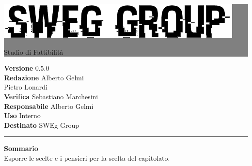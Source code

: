 \documentclass[12pt,a4paper,titlepage]{article}
\newcommand{\HRule}[1]{\hfill \rule{0.2\linewidth}{#1}} %
\begin{document}
	
	\thispagestyle{empty} %
	
	
	\colorbox{grey}{
		\parbox[t]{1.0\linewidth}{
			\centering \fontsize{50pt}{80pt}\selectfont %
			\vspace*{0.7cm} %
			
			\raggedleft
			\includegraphics[width=0.7\linewidth]{../../LogoSWEgGroupSFONDOVUOTO}
			
			\hfill Studio di Fattibilità \\
			
			\vspace*{0.7cm} %
		}
	}
	
	
	\vfill %
	
	
	{\centering \large 
		\hfill \textbf{Versione} 0.5.0 \\
		\hfill \textbf{Redazione} Alberto Gelmi \\
		\hfill Pietro Lonardi \\
		\hfill \textbf{Verifica} Sebastiano Marchesini \\
		\hfill \textbf{Responsabile} Alberto Gelmi \\
		\hfill \textbf{Uso} Interno\\
		\hfill \textbf{Destinato} SWEg Group\\ 
		
		\HRule{1pt}
		
		\textbf{Sommario} \\
		Esporre le scelte e i pensieri per la scelta del capitolato.
		
	} %
	
\end{document}
